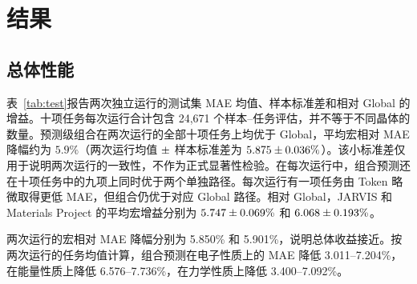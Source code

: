 \documentclass[a4paper,fleqn]{cas-sc}
\renewcommand{\pm}{\mathbin{\hbox{\normalfont ±}}}
\begin{document}
\section{结果}
\subsection{总体性能}
表~\ref{tab:test}报告两次独立运行的测试集 MAE 均值、样本标准差和相对 Global 的增益。十项任务每次运行合计包含 24,671 个样本--任务评估，并不等于不同晶体的数量。预测级组合在两次运行的全部十项任务上均优于 Global，平均宏相对 MAE 降幅约为 $5.9\%$（两次运行均值 $\pm$ 样本标准差为 $5.875\pm0.036\%$）。该小标准差仅用于说明两次运行的一致性，不作为正式显著性检验。在每次运行中，组合预测还在十项任务中的九项上同时优于两个单独路径。每次运行有一项任务由 Token 略微取得更低 MAE，但组合仍优于对应 Global 路径。相对 Global，JARVIS 和 Materials Project 的平均宏增益分别为 $5.747\pm0.069\%$ 和 $6.068\pm0.193\%$。

两次运行的宏相对 MAE 降幅分别为 5.850\% 和 5.901\%，说明总体收益接近。按两次运行的任务均值计算，组合预测在电子性质上的 MAE 降低 3.011--7.204\%，在能量性质上降低 6.576--7.736\%，在力学性质上降低 3.400--7.092\%。
\end{document}
